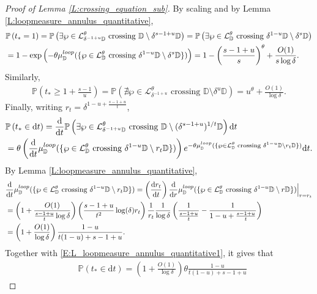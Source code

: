 \documentclass[11pt]{article}
\theoremstyle{remark}
\newcommand{\D}{\mathbb{D}}
\newcommand{\Lc}{\mathcal{L}}
\newcommand{\Prob}[1]{\mathbb{P} \left( #1 \right) }
\renewcommand{\d}{\mathrm{d}}
\def \loopmeasure{\mu^{\rm loop}}
\numberwithin{equation}{section}
\begin{document}
\begin{proof}[Proof of Lemma \ref{L:crossing_equation_sub}]
By scaling and by Lemma \ref{L:loopmeasure_annulus_quantitative},
\begin{align*}
& \Prob{t_* = 1} =  \Prob{ \exists \wp \in \Lc_{\delta^{-1+u} \D}^\theta \text{~crossing~} \D \setminus \delta^{s-1+u} \D}
= \Prob{ \exists \wp \in \Lc_{\D}^\theta \text{~crossing~} \delta^{1-u} \D \setminus \delta^s \D} \\
& = 1 - \exp \left( - \theta \loopmeasure_\D (\{\wp \in \Lc_{\D}^\theta \text{~crossing~} \delta^{1-u} \D \setminus \delta^s \D\}) \right)
= 1 - \left( \frac{s-1+u}{s} \right)^\theta + \frac{O(1)}{s \log \delta}.
\end{align*}
Similarly,
\begin{align*}
\Prob{t_* \geq 1 + \frac{s-1}{u} } = \Prob{ \nexists \wp \in \Lc_{\delta^{-1+u}}^\theta \text{~crossing~} \D \setminus \delta^u \D }
= u^\theta + \frac{O(1)}{\log \delta}.
\end{align*}
Finally, writing $r_t = \delta^{1-u + \frac{s-1+u}{t}}$,
\begin{align*}
& \Prob{t_* \in \d t} = \frac{\d}{\d t} \Prob{ \exists \wp \in \Lc_{\delta^{-1+u} \D}^\theta \text{~crossing~} \D \setminus (\delta^{s-1+u})^{1/t} \D} \d t \\
& = \theta \left( \frac{\d}{\d t} \loopmeasure_\D ( \{ \wp \in \Lc_{\D}^\theta \text{~crossing~} \delta^{1-u} \D \setminus r_t \D \} ) \right) e^{ - \theta \loopmeasure_\D ( \{ \wp \in \Lc_{\D}^\theta \text{~crossing~} \delta^{1-u} \D \setminus r_t \D \} ) } \d t.
\end{align*}
By Lemma \ref{L:loopmeasure_annulus_quantitative},
\begin{align*}
& \frac{\d}{\d t} \loopmeasure_\D ( \{ \wp \in \Lc_{\D}^\theta \text{~crossing~} \delta^{1-u} \D \setminus r_t \D \} ) = \left( \frac{\d r_t}{\d t} \right) \frac{\d}{\d r} \loopmeasure_\D ( \{ \wp \in \Lc_{\D}^\theta \text{~crossing~} \delta^{1-u} \D \setminus r \D \} ) \Big\vert_{r = r_t} \\
& = \left( 1 + \frac{O(1)}{\frac{s-1+u}{t} \log \delta} \right)  \left( \frac{s-1+u}{t^2} \log (\delta) r_t \right) \frac{1}{r_t} \frac{1}{\log \delta} \left( \frac{1}{\frac{s-1+u}{t}} - \frac{1}{1-u + \frac{s-1+u}{t}} \right) \\
& = \left( 1 + \frac{O(1)}{\log \delta} \right) \frac{1-u}{t(1-u)+s-1+u}.
\end{align*}
Together with \eqref{E:L_loopmeasure_annulus_quantitative1}, it gives that
\begin{align*}
& \Prob{t_* \in \d t}
= \left( 1 + \frac{O(1)}{\log \delta} \right) \theta \frac{1-u}{t(1-u)+s-1+u}

\end{align*}
\end{proof}
\end{document}
